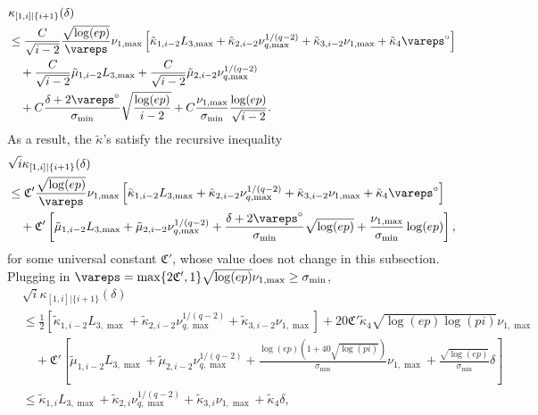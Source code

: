 \documentclass[aos]{imsart}
\begin{document}
\begin{equation*} %
\begin{aligned}
    & \kappa_{[1,i]|\{i+1\}}(\delta) \\
    & \leq \frac{C}{\sqrt{i-2}} 
    \frac{\sqrt{\log(ep)}}{\vareps} \nu_{1,\max}
    \left[ 
        \tilde\kappa_{1,i-2} {L}_{3,\max}
        + \tilde\kappa_{2,i-2} {\nu}_{q,\max}^{1/(q-2)}
        + \tilde\kappa_{3,i-2} \nu_{1,\max}
        + \tilde\kappa_{4} {\vareps^\circ}
    \right]
    \\
    & \quad + \frac{C}{\sqrt{i-2}} \tilde\mu_{1,i-2} {{L}_{3,\max}}
    + \frac{C}{\sqrt{i-2}} \tilde\mu_{2,i-2} {{\nu}_{q,\max}^{1/(q-2)}} \\
    & \quad + C\frac{\delta + 2\vareps^\circ}{\sigma_{\min}} \sqrt{\frac{\log(ep)}{i-2}}
    + C\frac{\nu_{1,\max}}{\sigma_{\min}} \frac{\log(ep)}{\sqrt{i-2}}.
\end{aligned}
\end{equation*}
As a result, the $\tilde\kappa$'s satisfy the recursive inequality
\begin{equation} \label{eq:recursion_kappa_3N}
\begin{aligned}
    & \sqrt{i} \kappa_{[1,i]|\{i+1\}}(\delta) \\
    & \leq \mathfrak{C}' \frac{\sqrt{\log(ep)}}{\vareps} \nu_{1,\max}
    \left[ 
        \tilde\kappa_{1,i-2} {L}_{3,\max}
        + \tilde\kappa_{2,i-2} \nu_{q,\max}^{1/(q-2)}
        + \tilde\kappa_{3,i-2} \nu_{1,\max}
        + \tilde\kappa_{4} \vareps^\circ
    \right]
    \\
    & \quad + \mathfrak{C}'  \left[ 
        \tilde\mu_{1,i-2} {{L}_{3,\max}}
        + \tilde\mu_{2,i-2} {{\nu}_{q,\max}^{1/(q-2)}} 
        + \frac{\delta + 2\vareps^\circ}{\sigma_{\min}} \sqrt{\log(ep)}
        + \frac{\nu_{1,\max}}{\sigma_{\min}} \log(ep)
    \right],
\end{aligned}
\end{equation}
for some universal constant $\mathfrak{C}'$, whose value does not change in this subsection.
Plugging in $\vareps = \max\{2 \mathfrak{C}', 1\} \sqrt{\log(ep)} {\nu}_{1,\max} \geq \sigma_{\min}$,
\begin{equation*}
\begin{aligned}
    & \sqrt{i} \kappa_{[1,i]|\{i+1\}}(\delta) \\
    & \leq \frac{1}{2}
    \left[ 
        \tilde\kappa_{1,i-2} {{L}_{3,\max}}
        + \tilde\kappa_{2,i-2} {{\nu}_{q,\max}^{1/(q-2)}}
        + \tilde\kappa_{3,i-2} {\nu_{1,\max}}
    \right] 
    + 20 \mathfrak{C}' \tilde\kappa_{4} \sqrt{\log(ep)\log(pi)} \nu_{1,\max} \\
    & \quad  
    + \mathfrak{C}' \left[ 
        \tilde\mu_{1,i-2} {L}_{3,\max}
        + \tilde\mu_{2,i-2} \nu_{q,\max}^{1/(q-2)}  
        + \frac{\log(ep)(1+40 \sqrt{\log(p i)})}{\sigma_{\min}} {\nu}_{1,\max}
        + \frac{\sqrt{\log(ep)}}{\sigma_{\min}} \delta
    \right]
    \\
    & \leq \tilde\kappa_{1,i} {L}_{3,\max}
    + \tilde\kappa_{2,i} \nu_{q,\max}^{1/(q-2)}
    + \tilde\kappa_{3,i} \nu_{1,\max}
    + \tilde\kappa_{4} \delta,
\end{aligned}
\end{equation*}
\end{document}
